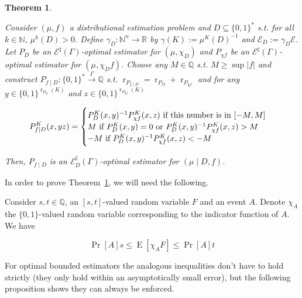 \documentclass{article}
\numberwithin{equation}{section}
\theoremstyle{definition}
\theoremstyle{plain}
\newtheorem{theorem}{Theorem}[section]
\newcommand{\Bool}{\{0,1\}}
\newcommand{\Words}{{\Bool^*}}
\DeclareMathOperator{\Prb}{Pr}
\DeclareMathOperator{\E}{E}
\DeclareMathOperator{\R}{r}
\newcommand{\Nats}{\mathbb{N}}
\newcommand{\Rats}{\mathbb{Q}}
\newcommand{\Reals}{\mathbb{R}}
\newcommand{\NatFun}{\Nats^n \rightarrow}
\newcommand{\Abs}[1]{\lvert #1 \rvert}
\newcommand{\Fall}{\mathcal{E}}
\newcommand{\ESG}{\Fall^\sharp(\Gamma)}
\newcommand{\BoolR}[1]{\Bool^{\R_{#1}(K)}}
\newcommand{\Scheme}{\xrightarrow{\Gamma}}
\begin{document}
\begin{samepage}
\begin{theorem}
\label{thm:cond}

Consider $(\mu, f)$ a distributional estimation problem and ${D \subseteq \Words}$ s.t. for all $k \in \Nats$, $\mu^k(D) > 0$. Define $\gamma_D: \NatFun \Reals$ by $\gamma(K):=\mu^{K}(D)^{-1}$ and $\Fall_D:=\gamma_D \Fall$. Let $P_D$ be an $\ESG$-optimal estimator for $(\mu, \chi_D)$ and $P_{\chi f}$ be an $\ESG$-optimal estimator for $(\mu, \chi_D f)$. Choose any $M \in \Rats$ s.t. ${M \geq \sup \Abs{f}}$ and construct $P_{f \mid D}: \Words \Scheme \Rats$ s.t. $\R_{P_{f \mid D}} = \R_{P_D} + \R_{P_{\chi f}}$ and for any ${y \in \BoolR{P_D}}$ and $z \in \BoolR{P_{\chi f}}$ 

\begin{equation}
P_{f \mid D}^K(x,yz)=\begin{cases}P_D^K(x,y)^{-1} P_{\chi f}^K(x,z) \textnormal{ if this number is in } [-M,M] \\ M \textnormal{ if } P_D^K(x,y)=0 \textnormal{ or } P_D^K(x,y)^{-1} P_{\chi f}^K(x,z) > M\\ -M \textnormal{ if } P_D^K(x,y)^{-1} P_{\chi f}^K(x,z) < -M\end{cases}
\end{equation}

Then, $P_{f \mid D}$ is an $\Fall_D^\sharp(\Gamma)$-optimal estimator for $(\mu \mid D, f)$.

\end{theorem}
\end{samepage}

In order to prove Theorem~\ref{thm:cond}, we will need the following.

Consider $s,t \in \Rats$, an $[s,t]$-valued random variable $F$ and an event $A$. Denote $\chi_A$ the $\Bool$-valued random variable corresponding to the indicator function of $A$. We have 

\begin{equation}
\Prb[A]s \leq \E[\chi_A F] \leq \Prb[A]t
\end{equation}

For optimal bounded estimators the analogous inequalities don't have to hold strictly (they only hold within an asymptotically small error), but the following proposition shows they can always be enforced.
\end{document}
